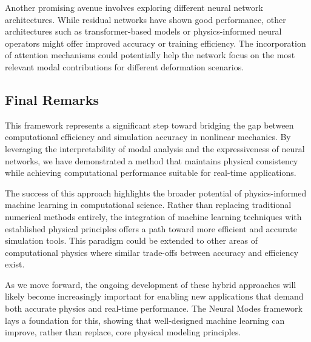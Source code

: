 \documentclass[11pt,a4paper]{article}
\numberwithin{equation}{section}
\begin{document}
Another promising avenue involves exploring different neural network architectures. While residual networks have shown good performance, other architectures such as transformer-based models or physics-informed neural operators might offer improved accuracy or training efficiency. The incorporation of attention mechanisms could potentially help the network focus on the most relevant modal contributions for different deformation scenarios.


\subsection{Final Remarks}
This framework represents a significant step toward bridging the gap between computational efficiency and simulation accuracy in nonlinear mechanics. By leveraging the interpretability of modal analysis and the expressiveness of neural networks, we have demonstrated a method that maintains physical consistency while achieving computational performance suitable for real-time applications.

The success of this approach highlights the broader potential of physics-informed machine learning in computational science. Rather than replacing traditional numerical methods entirely, the integration of machine learning techniques with established physical principles offers a path toward more efficient and accurate simulation tools. This paradigm could be extended to other areas of computational physics where similar trade-offs between accuracy and efficiency exist.

As we move forward, the ongoing development of these hybrid approaches will likely become increasingly important for enabling new applications that demand both accurate physics and real-time performance. The Neural Modes framework lays a foundation for this, showing that well-designed machine learning can improve, rather than replace, core physical modeling principles.
\newpage
\printbibliography
\end{document}
